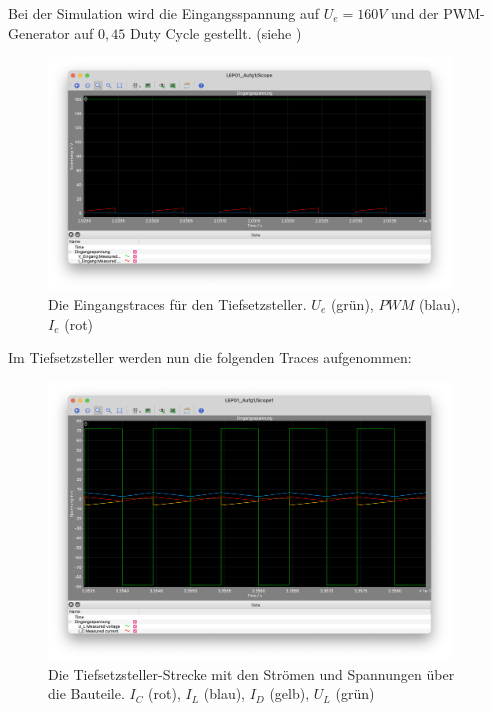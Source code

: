 \documentclass{report}
\begin{document}
Bei der Simulation wird die Eingangsspannung auf $U_e = 160V$ und der PWM-Generator auf $0,45$ Duty Cycle gestellt. (siehe )

\begin{figure}[hbt!]
	\begin{center}
		\includegraphics[width=0.95\textwidth]{./assets/img/aufg1_eingang.png}
	\end{center}
	\caption{Die Eingangstraces für den Tiefsetzsteller. $U_e$ (grün), $PWM$ (blau), $I_e$ (rot)}
	\label{fig:aufg1_eingang}
\end{figure}

Im Tiefsetzsteller werden nun die folgenden Traces aufgenommen:

\begin{figure}[hbt!]
	\begin{center}
		\includegraphics[width=0.95\textwidth]{assets/img/aufg1_strecke.png}
	\end{center}
	\caption{Die Tiefsetzsteller-Strecke mit den Strömen und Spannungen über die Bauteile. $I_C$ (rot), $I_L$ (blau), $I_D$ (gelb), $U_L$ (grün)}
	\label{fig:aufg1_strecke}
\end{figure}
\end{document}
